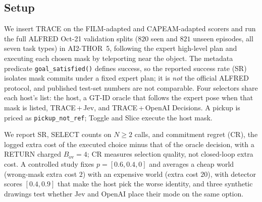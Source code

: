 \documentclass[conference]{IEEEtran}
\begin{document}
\subsection{Setup}
\label{sec:setup}
We insert TRACE on the FILM-adapted and CAPEAM-adapted scorers and run the full ALFRED Oct-21 validation splits ($820$ seen and $821$ unseen episodes, all seven task types) in AI2-THOR~5, following the expert high-level plan and executing each chosen mask by teleporting near the object.
The metadata predicate \texttt{goal\_satisfied()} defines success, so the reported success rate (SR) isolates mask commits under a fixed expert plan; it is \emph{not} the official ALFRED protocol, and published test-set numbers are not comparable.
Four selectors share each host's list: the host, a GT-ID oracle that follows the expert pose when that mask is listed, TRACE\,+\,Jev, and TRACE\,+\,OpenAI Decisions.
A \Diff{} pickup is priced as \texttt{pickup\_not\_ref}; Toggle and Slice execute the host mask. %

We report SR, SELECT counts on $N\ge 2$ calls, and commitment regret (CR), the logged extra cost of the executed choice minus that of the oracle decision, with a RETURN charged $B_{\mathrm{ov}}{=}4$; CR measures selection quality, not closed-loop extra cost.
A controlled study fixes $p{=}[0.6,0.4,0]$ and averages a cheap world (wrong-mask extra cost $2$) with an expensive world (extra cost $20$), with detector scores $[0.4,0.9]$ that make the host pick the worse identity, and three synthetic drawings test whether Jev and OpenAI place their mode on the same option.
\end{document}
